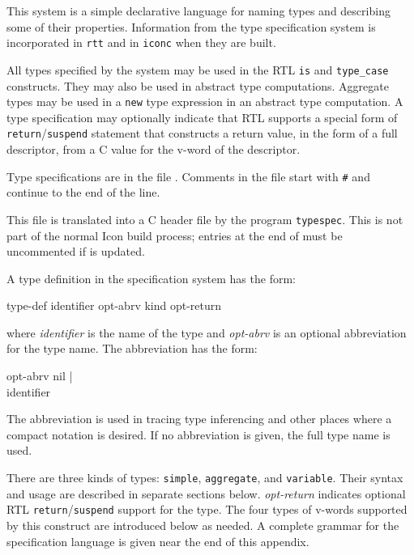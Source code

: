 This system is a simple declarative language for naming types and
describing some of their properties. Information from the type
specification system is incorporated in \texttt{rtt} and in \texttt{iconc}
when they are built.

All types specified by the system may be used in the RTL \texttt{is} and
\texttt{type\_case} constructs. They may also be used in abstract type
computations. Aggregate types may be used in a \texttt{new} type expression
in an abstract type computation. A type specification may optionally
indicate that RTL supports a special form of
\texttt{return}/\texttt{suspend} statement that constructs a return value,
in the form of a full descriptor, from a C value for the v-word of the
descriptor.

Type specifications are in the file .  Comments
in the file start with \texttt{\#} and continue to the end of the line.

This file is translated into a C header file by the program \texttt{typespec}.
This is not part of the normal Icon build process; entries at the end of
 must be uncommented if  is
updated.

A type definition in the specification system has the form:

\begin{ebnf}
type-def \cceq identifier opt-abrv \tokcolon kind opt-return
\end{ebnf}

\noindent
where \textit{identifier} is the name of the type and \textit{opt-abrv} is an optional abbreviation for the type name. The abbreviation
has the form:

\begin{ebnf}
opt-abrv \cceq nil |\\
\>\>\>\> \toklcbra identifier \tokrcbra
\end{ebnf}

\noindent
The abbreviation is used in tracing type inferencing and other places where
a compact notation is desired. If no abbreviation is given, the full type
name is used.

There are three kinds of types: \texttt{simple}, \texttt{aggregate}, and
\texttt{variable}. Their syntax and usage are described in separate
sections below. \textit{opt-return} indicates optional RTL
\texttt{return}/\texttt{suspend} support for the type. The four types of
v-words supported by this construct are introduced below as needed. A
complete grammar for the specification language is given near the end of
this appendix.

